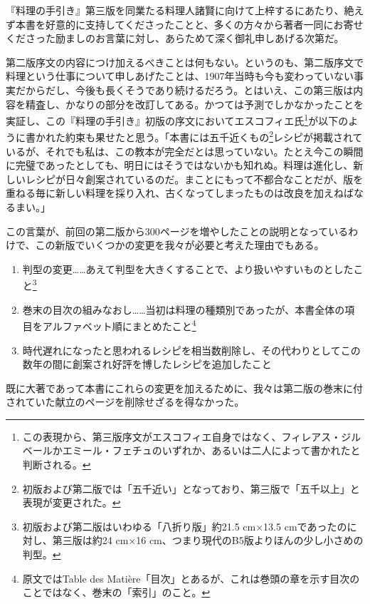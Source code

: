 \begin{main}

\vspace*{1\zw}

『料理の手引き』第三版を同業たる料理人諸賢に向けて上梓するにあたり、絶えず本書を好意的に支持してくださったことと、多くの方々から著者一同にお寄せくださった励ましのお言葉に対し、あらためて深く御礼申しあげる次第だ。

第二版序文の内容につけ加えるべきことは何もない。というのも、第二版序文で料理という仕事について申しあげたことは、1907年当時も今も変わっていない事実だからだし、今後も長くそうであり続けるだろう。とはいえ、この第三版は内容を精査し、かなりの部分を改訂してある。かつては予測でしかなかったことを実証し、この『料理の手引き』初版の序文においてエスコフィエ氏\footnote{この表現から、第三版序文がエスコフィエ自身ではなく、フィレアス・ジルベールかエミール・フェチュのいずれか、あるいは二人によって書かれたと判断される。}が以下のように書かれた約束も果せたと思う。「本書には五千近くもの\footnote{初版および第二版では「五千近い」となっており、第三版で「五千以上」と表現が変更された。}レシピが掲載されているが、それでも私は、この教本が完全だとは思っていない。たとえ今この瞬間に完璧であったとしても、明日にはそうではないかも知れぬ。料理は進化し、新しいレシピが日々創案されているのだ。まことにもって不都合なことだが、版を重ねる毎に新しい料理を採り入れ、古くなってしまったものは改良を加えねばなるまい。」

この言葉が、前回の第二版から300ページを増やしたことの説明となっているわけで、この新版でいくつかの変更を我々が必要と考えた理由でもある。

\begin{enumerate}
\def\labelenumi{\arabic{enumi}.}
\item
  判型の変更\ldots{}\ldots{}あえて判型を大きくすることで、より扱いやすいものとしたこと\footnote{初版および第二版はいわゆる「八折り版」約21.5
    cm×13.5 cmであったのに対し、第三版は約24 cm×16
    cm、つまり現代のB5版よりほんの少し小さめの判型。}
\item
  巻末の目次の組みなおし\ldots{}\ldots{}当初は料理の種類別であったが、本書全体の項目をアルファベット順にまとめたこと\footnote{原文ではTable
    des
    Matière「目次」とあるが、これは巻頭の章を示す目次のことではなく、巻末の「索引」のこと。}
\item
  時代遅れになったと思われるレシピを相当数削除し、その代わりとしてこの数年の間に創案され好評を博したレシピを追加したこと
\end{enumerate}

既に大著であって本書にこれらの変更を加えるために、我々は第二版の巻末に付されていた献立のページを削除せざるを得なかった。


\end{main}
